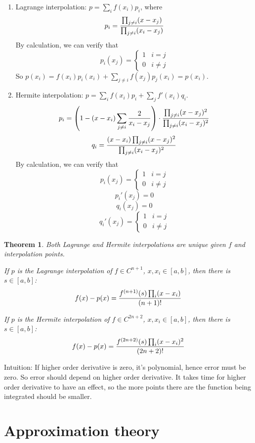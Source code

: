 \documentclass[20pt]{article} %
\theoremstyle{break}
\newtheorem{thm}[definition]{Theorem}
\begin{document}
\begin{enumerate}
\item Lagrange interpolation: $p=\sum_if(x_i)p_i$, where
  \[p_i={\prod_{j\not=i}(x-x_j)\over \prod_{j\not=i}(x_i-x_j)}\]
  By calculation, we can verify that
  \[p_i(x_j)=\begin{cases}1 & i=j\\0 & i\not=j\end{cases}\]
  So $p(x_i)=f(x_i)p_i(x_i)+\sum_{j\not=i}f(x_j)p_j(x_i)=p(x_i)$.
\item Hermite interpolation: $p=\sum_if(x_i)p_i+\sum_jf'(x_i)q_i$.
  \[p_i=\left(1-(x-x_i)\sum_{j\not=i}{2\over x_i-x_j}\right)\cdot {\prod_{j\not=i}(x-x_j)^2\over \prod_{j\not=i}(x_i-x_j)^2}\]
  \[q_i={(x-x_i)\prod_{j\not=i}(x-x_j)^2\over \prod_{j\not=i}(x_i-x_j)^2}\]
  By calculation, we can verify that
  \[p_i(x_j)=\begin{cases}1 & i=j\\0 & i\not=j\end{cases}\]
  \[p_i'(x_j)=0\]
  \[q_i(x_j)=0\]
  \[q_i'(x_j)=\begin{cases}1 & i=j\\0 & i\not=j\end{cases}\]
\end{enumerate}

\newpage

\begin{thm}
\item Both Lagrange and Hermite interpolations are unique given $f$ and interpolation points.
\item If $p$ is the Lagrange interpolation of $f\in C^{n+1}$, $x, x_i\in [a, b]$, then there is $s\in [a, b]$:
  \[f(x)-p(x)={f^{(n+1)}(s)\prod_i(x-x_i)\over (n+1)!}\]
\item If $p$ is the Hermite interpolation of $f\in C^{2n+2}$, $x, x_i\in [a, b]$, then there is $s\in [a, b]$:
  \[f(x)-p(x)={f^{(2n+2)}(s)\prod_i(x-x_i)^2\over (2n+2)!}\]  
\end{thm}

Intuition: If higher order derivative is zero, it's polynomial, hence error must be zero. So error should depend on higher order derivative. It takes time for higher order derivative to have an effect, so the more points there are the function being integrated should be smaller.

\newpage

\section{Approximation theory}
\end{document}
